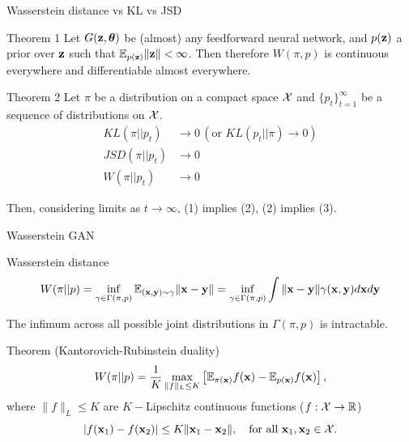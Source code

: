 \begin{frame}{Wasserstein distance vs KL vs JSD}
	\begin{block}{Theorem 1}
		Let $G(\mathbf{z}, \boldsymbol{\theta})$ be (almost) any feedforward neural network, and $p(\mathbf{z})$ a prior over $\mathbf{z}$ such that $\mathbb{E}_{p(\mathbf{z})} \|\mathbf{z}\| < \infty$. Then therefore $W(\pi, p)$ is continuous everywhere and differentiable almost everywhere.
	\end{block}
	\begin{block}{Theorem 2}
		Let $\pi$ be a distribution on a compact space $\mathcal{X}$ and $\{p_t\}_{t=1}^\infty$ be a sequence of distributions on $\mathcal{X}$. 
		\begin{align}
			KL(\pi || p_t) &\rightarrow 0 \, (\text{or }KL (p_t || \pi) \rightarrow 0) \\
			JSD(\pi || p_t) &\rightarrow 0 \\
			W(\pi || p_t) &\rightarrow 0
		\end{align}
		
		Then, considering limits as $t \rightarrow \infty$, (1) implies (2), (2) implies (3).
	\end{block}
\end{frame}
\begin{frame}{Wasserstein GAN}
	\begin{block}{Wasserstein distance}
		\vspace{-0.4cm}
		\[
			W(\pi || p) = \inf_{\gamma \in \Gamma(\pi, p)} \mathbb{E}_{(\mathbf{x}, \mathbf{y}) \sim \gamma} \| \mathbf{x} - \mathbf{y} \| =  \inf_{\gamma \in \Gamma(\pi, p)} \int \| \mathbf{x} - \mathbf{y} \| \gamma (\mathbf{x}, \mathbf{y}) d \mathbf{x} d \mathbf{y}
		\]
	\end{block}
	The infimum across all possible joint distributions in $\Gamma(\pi, p)$ is intractable.
	\begin{block}{Theorem (Kantorovich-Rubinstein duality)}
		\[
			W(\pi || p) = \frac{1}{K} \max_{\| f \|_L \leq K} \left[ \mathbb{E}_{\pi(\mathbf{x})} f(\mathbf{x})  - \mathbb{E}_{p(\mathbf{x})} f(\mathbf{x})\right],
		\]
		where $\| f \|_L \leq K$ are $K-$Lipschitz continuous functions ($f: \mathcal{X} \rightarrow \mathbb{R}$)
		\[
			|f(\mathbf{x}_1) - f(\mathbf{x}_2)| \leq K \| \mathbf{x}_1 - \mathbf{x}_2 \|, \quad \text{for all } \mathbf{x}_1, \mathbf{x}_2 \in \mathcal{X}.
		\]
	\end{block}

\end{frame}
